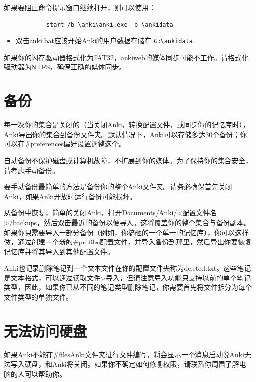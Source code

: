\documentclass[a4paper]{book}
\begin{document}
		如果要阻止命令提示窗口继续打开，则可以使用：
		
		\begin{shaded}\begin{verbatim}
			start /b \anki\anki.exe -b \ankidata
			\end{verbatim}\end{shaded}
		
		\begin{itemize}
			\itemsep1pt\parskip0pt
			\item 双击anki.bat应该开始Anki的用户数据存储在 \verb|G:\ankidata|.
		\end{itemize}
		
		
		\begin{shaded}
			如果你的闪存驱动器格式化为FAT32，ankiweb的媒体同步可能不工作。请格式化驱动器为NTFS，确保正确的媒体同步。
		\end{shaded}
		
		\section{备份}
		每一次你的集合是关闭的（当关闭Anki，转换配置文件，或同步你的记忆库时），Anki导出你的集合到备份文件夹。默认情况下，Anki可以存储多达30个备份；你可以在\url{#preferences}偏好设置调整这个。
		
		自动备份不保护磁盘或计算机故障，不扩展到你的媒体。为了保持你的集合安全，请考虑手动备份。
		
		要手动备份最简单的方法是备份你的整个Anki文件夹。请务必确保首先关闭Anki，如果Anki开放时运行备份可能损坏。
		
		从备份中恢复，简单的关闭Anki，打开Documents/Anki/<配置文件名>/backups，然后双击最近的备份以便导入。这将覆盖你的整个集合与备份副本。如果你只需要导入一部分备份（例如，你搞砸的一个单一的记忆库），你可以这样做，通过创建一个新的\url{#profiles}配置文件，并导入备份到那里，然后导出你要恢复记忆库并将其导入到其他配置文件。
		
		Anki也记录删除笔记到一个文本文件在你的配置文件夹称为deleted.txt。这些笔记是文本格式，可以通过读取文件>导入，但请注意导入功能只支持以前的单个笔记类型，因此，如果你已从不同的笔记类型删除笔记，你需要首先将文件拆分为每个文件类型的单独文件。
		
		\section{无法访问硬盘}
		
		如果Anki不能在\url{#files}Anki文件夹进行文件编写，将会显示一个消息启动说Anki无法写入硬盘，和Anki将关闭。如果你不确定如何修复权限，请联系你周围了解电脑的人可以帮助你。
		
\end{document}
